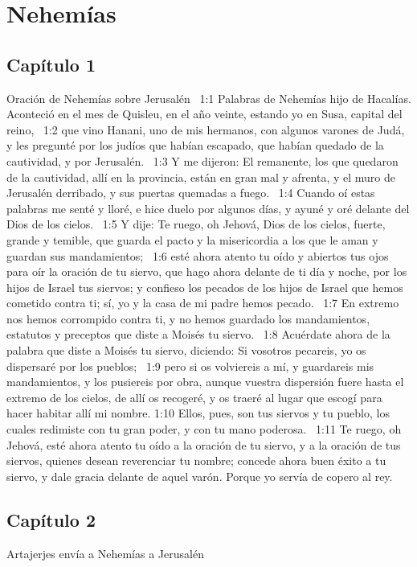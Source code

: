 \chapter{Nehemías}

\section*{Capítulo 1}
Oración de Nehemías sobre Jerusalén  
1:1 Palabras de Nehemías hijo de Hacalías. Aconteció en el mes de Quisleu, en el año veinte, estando yo en Susa, capital del reino,  
1:2 que vino Hanani, uno de mis hermanos, con algunos varones de Judá, y les pregunté por los judíos que habían escapado, que habían quedado de la cautividad, y por Jerusalén.  
1:3 Y me dijeron: El remanente, los que quedaron de la cautividad, allí en la provincia, están en gran mal y afrenta, y el muro de Jerusalén derribado, y sus puertas quemadas a fuego.  
1:4 Cuando oí estas palabras me senté y lloré, e hice duelo por algunos días, y ayuné y oré delante del Dios de los cielos.  
1:5 Y dije: Te ruego, oh Jehová, Dios de los cielos, fuerte, grande y temible, que guarda el pacto y la misericordia a los que le aman y guardan sus mandamientos;  
1:6 esté ahora atento tu oído y abiertos tus ojos para oír la oración de tu siervo, que hago ahora delante de ti día y noche, por los hijos de Israel tus siervos; y confieso los pecados de los hijos de Israel que hemos cometido contra ti; sí, yo y la casa de mi padre hemos pecado.  
1:7 En extremo nos hemos corrompido contra ti, y no hemos guardado los mandamientos, estatutos y preceptos que diste a Moisés tu siervo.  
1:8 Acuérdate ahora de la palabra que diste a Moisés tu siervo, diciendo: Si vosotros pecareis, yo os dispersaré por los pueblos;  
1:9 pero si os volviereis a mí, y guardareis mis mandamientos, y los pusiereis por obra, aunque vuestra dispersión fuere hasta el extremo de los cielos, de allí os recogeré, y os traeré al lugar que escogí para hacer habitar allí mi nombre. 
1:10 Ellos, pues, son tus siervos y tu pueblo, los cuales redimiste con tu gran poder, y con tu mano poderosa.  
1:11 Te ruego, oh Jehová, esté ahora atento tu oído a la oración de tu siervo, y a la oración de tus siervos, quienes desean reverenciar tu nombre; concede ahora buen éxito a tu siervo, y dale gracia delante de aquel varón. Porque yo servía de copero al rey.  
\section*{Capítulo 2}
Artajerjes envía a Nehemías a Jerusalén  

